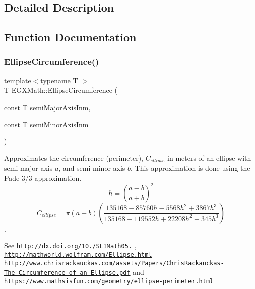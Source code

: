 \subsection{Detailed Description}


\subsection{Function Documentation}
\mbox{\label{group___e_g_x_math-_geometry-2_d-_ellipse_ga4172802ac674eb53467b44928ac635c7}} 
\subsubsection{\texorpdfstring{Ellipse\+Circumference()}{EllipseCircumference()}}
{\footnotesize\ttfamily template$<$typename T $>$ \\
T E\+G\+X\+Math\+::\+Ellipse\+Circumference (\begin{DoxyParamCaption}\item[{const T}]{semi\+Major\+Axis\+Inm,  }\item[{const T}]{semi\+Minor\+Axis\+Inm }\end{DoxyParamCaption})}



Approximates the circumference (perimeter), $C_{ellipse}$ in meters of an ellipse with semi-\/major axis $a$, and semi-\/minor axis $b$. This approximation is done using the Pade 3/3 approximation. \[ h=\left( \frac{a-b}{a+b} \right)^2 \] \[ C_{ellipse}=\pi (a + b) \left( \frac{135168-85760 h-5568 h^2+ 3867 h^3}{135168-119552 h+ 22208 h^2 - 345h^3} \right) \]. 

See \href{http://dx.doi.org/10.3247/SL1Math05.004}{\tt http\+://dx.\+doi.\+org/10./\+S\+L1\+Math05.} , \href{http://mathworld.wolfram.com/Ellipse.html}{\tt http\+://mathworld.\+wolfram.\+com/\+Ellipse.\+html} \href{http://www.chrisrackauckas.com/assets/Papers/ChrisRackauckas-The_Circumference_of_an_Ellipse.pdf}{\tt http\+://www.\+chrisrackauckas.\+com/assets/\+Papers/\+Chris\+Rackauckas-\/\+The\+\_\+\+Circumference\+\_\+of\+\_\+an\+\_\+\+Ellipse.\+pdf} and \href{https://www.mathsisfun.com/geometry/ellipse-perimeter.html}{\tt https\+://www.\+mathsisfun.\+com/geometry/ellipse-\/perimeter.\+html}

